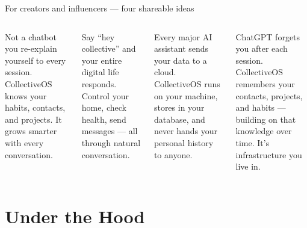 \documentclass[aspectratio=169, 10pt]{beamer}
\begin{document}
\begin{frame}{For creators and influencers — four shareable ideas}
  \begin{columns}[T]
      \begin{tcolorbox}[skycard, title={``Finally — an AI that knows your life''}]
        \small
        Not a chatbot you re-explain yourself to every session. CollectiveOS knows your habits, contacts, and projects. It grows smarter with every conversation.
      \end{tcolorbox}
      \vspace{5pt}
      \begin{tcolorbox}[indigocard, title={``Voice-first future — already here''}]
        \small
        Say ``hey collective'' and your entire digital life responds. Control your home, check health, send messages — all through natural conversation.
      \end{tcolorbox}

      \begin{tcolorbox}[greencard, title={``Your data stays yours. Always.''}]
        \small
        Every major AI assistant sends your data to a cloud. CollectiveOS runs on your machine, stores in your database, and never hands your personal history to anyone.
      \end{tcolorbox}
      \vspace{5pt}
      \begin{tcolorbox}[ambercard, title={``Not an app. An OS for your life.''}]
        \small
        ChatGPT forgets you after each session. CollectiveOS remembers your contacts, projects, and habits — building on that knowledge over time. It's infrastructure you live in.
      \end{tcolorbox}
  \end{columns}
\end{frame}

\section{Under the Hood}
\end{document}
